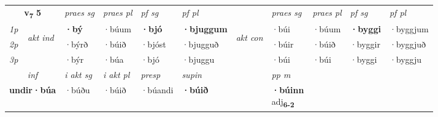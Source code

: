 \noindent
\begin{tabular}{lllllllllll} \toprule
\multicolumn{2}{c}{\textbf{v{\textsubscript{7}}} \Large{\textbf{5}}}  &  \textit{praes sg}  & \textit{praes pl}  &\textit{ pf sg} & \textit{pf pl} &  &  \textit{praes sg}  & \textit{praes pl}  & \textit{pf sg} & \textit{pf pl } \\*
	\cmidrule{3-6} \cmidrule{8-11}
 {\textit{1p}} & \multirow{3}{*}{\begin{turn}{90}\textit{akt ind}\end{turn}} & \textbf{·bý} & ·búum & \textbf{·bjó} & \textbf{·bjuggum} & \multirow{3}{*}{\begin{turn}{90}\textit{akt con}\end{turn}} &·búi & ·búum & \textbf{·byggi} & ·byggjum\\*
 {\textit{2p}} &  &  ·býrð  & ·búið & ·bjóst & ·bjugguð & & ·búir & ·búið & ·byggir & ·byggjuð \\*
{\textit{3p}} &  & ·býr & ·búa & ·bjó & ·bjuggu & & ·búi & ·búi& ·byggi & ·byggju \\*
\cmidrule{3-6} \cmidrule{8-11}

   \multicolumn{2}{c}{\textit{inf}}  & \textit{i akt sg} & \textit{i akt pl}   & \textit{presp} & \textit{supin}  && \textit{pp m} \\*
  \multicolumn{2}{c}{\textbf{undir\allowbreak ·búa}} & ·búðu  & ·búið   & ·búandi &  \textbf{·búið}  && \specialcell{\textbf{·búinn} \\ adj\textbf{\textsubscript{6-2}}} \\*
\end{tabular}

